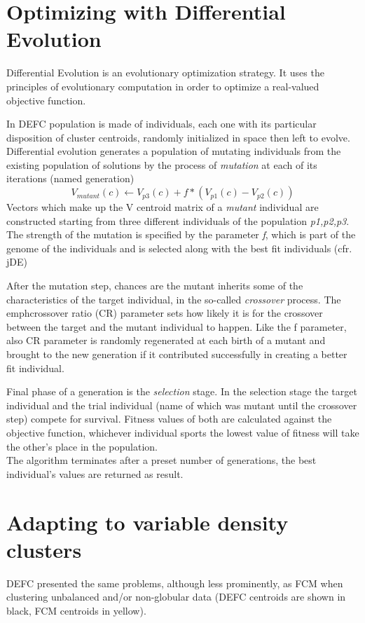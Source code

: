 \documentclass[a4paper]{article}
\begin{document}
\section{Optimizing with Differential Evolution}
Differential Evolution is an evolutionary optimization strategy. It uses the principles of evolutionary computation in order to optimize a real-valued objective function.

In DEFC population is made of individuals, each one with its particular disposition of cluster centroids, randomly initialized in space then left to evolve.\\
Differential evolution generates a population of mutating individuals from the existing population of solutions by the process of \emph{mutation} at each of its iterations (named generation)
$$V_{mutant}(c) \longleftarrow V_{p3}(c) + f*(V_{p1}(c)-V_{p2}(c))$$
Vectors which make up the V centroid matrix of a \emph{mutant} individual are constructed starting from three different individuals of the population \emph{p1,p2,p3}. The strength of the mutation is specified by the parameter \emph{f}, which is part of the genome of the individuals and is selected along with the best fit individuals (cfr. jDE)

After the mutation step, chances are the mutant inherits some of the characteristics of the target individual, in the so-called \emph{crossover} process. The emph{crossover ratio} (CR) parameter sets how likely it is for the crossover between the target and the mutant individual to happen. Like the f parameter, also CR parameter is randomly regenerated at each birth of a mutant and brought to the new generation if it contributed successfully in creating a better fit individual.

Final phase of a generation is the \emph{selection} stage. In the selection stage the target individual and the trial individual (name of which was mutant until the crossover step) compete for survival. Fitness values of both are calculated against the objective function, whichever individual sports the lowest value of fitness will take the other's place in the population.\\
The algorithm terminates after a preset number of generations, the best individual's values are returned as result.

\section{Adapting to variable density clusters}
DEFC presented the same problems, although less prominently, as FCM when clustering unbalanced and/or non-globular data (DEFC centroids are shown in black, FCM centroids in yellow).\\
\end{document}

